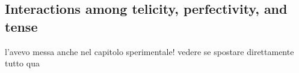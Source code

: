 

\subsection{Interactions among telicity, perfectivity, and tense}
l'avevo messa anche nel capitolo sperimentale! vedere se spostare direttamente tutto qua


